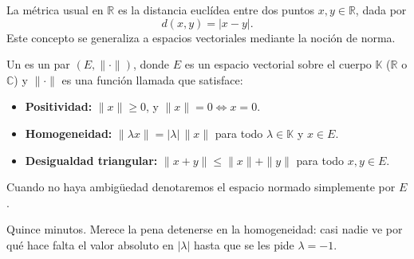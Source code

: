 %

\begin{frame}

La métrica usual en $\mathbb{R}$ es la distancia euclídea entre dos puntos
$x, y \in \mathbb{R}$, dada por
\[
  d(x,y) = |x-y|.
\]
Este concepto se generaliza a espacios vectoriales mediante la noción de norma.


\begin{definition}
Un  es un par $(E, \|\cdot\|)$, donde $E$ es un
espacio vectorial sobre el cuerpo $\mathbb{K}$ ($\mathbb{R}$ o $\mathbb{C}$) y
$\|\cdot\|$ es una función llamada  que satisface:
\begin{itemize}
  \item \textbf{Positividad:} $\|x\| \geq 0$, y $\|x\| = 0 \iff x = 0$.
  \item \textbf{Homogeneidad:} $\|\lambda x\| = |\lambda|\,\|x\|$ para todo
        $\lambda \in \mathbb{K}$ y $x \in E$.
  \item \textbf{Desigualdad triangular:} $\|x+y\| \leq \|x\| + \|y\|$ para
        todo $x, y \in E$.
\end{itemize}
Cuando no haya ambigüedad denotaremos el espacio normado simplemente por $E$.
\end{definition}

\begin{teaching}[Ritmo]
Quince minutos. Merece la pena detenerse en la homogeneidad: casi nadie ve por
qué hace falta el valor absoluto en $|\lambda|$ hasta que se les pide
$\lambda = -1$.
\end{teaching}
\end{frame}

